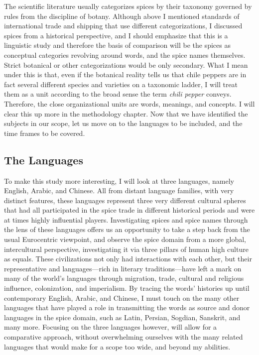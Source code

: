 The scientific literature usually categorizes spices by their taxonomy governed by rules from the discipline of botany. Although above I mentioned standards of international trade and shipping that use different categorizations, I discussed spices from a historical perspective, and I should emphasize that this is a linguistic study and therefore the basis of comparison will be the spices as conceptual categories revolving around words, and the spice names themselves. Strict botanical or other categorizations would be only secondary. What I mean under this is that, even if the botanical reality tells us that chile peppers are in fact several different species and varieties on a taxonomic ladder, I will treat them as a unit according to the broad sense the term \textit{chili pepper} conveys. Therefore, the close organizational units are words, meanings, and concepts. I will clear this up more in the methodology chapter. Now that we have identified the subjects in our scope, let us move on to the languages to be included, and the time frames to be covered.


\subsection{The Languages}

To make this study more interesting, I will look at three languages, namely English, Arabic, and Chinese. All from distant language families, with very distinct features, these languages represent three very different cultural spheres that had all participated in the spice trade in different historical periods and were at times highly influential players. Investigating spices and spice names through the lens of these languages offers us an opportunity to take a step back from the usual Eurocentric viewpoint, and observe the spice domain from a more global, intercultural perspective, investigating it via three pillars of human high culture as equals. These civilizations not only had interactions with each other, but their representative and languages---rich in literary traditions---have left a mark on many of the world's languages through migration, trade, cultural and religious influence, colonization, and imperialism. By tracing the words' histories up until contemporary English, Arabic, and Chinese, I must touch on the many other languages that have played a role in transmitting the words as source and donor languages in the spice domain, such as Latin, Persian, Sogdian, Sanskrit, and many more. Focusing on the three languages however, will allow for a comparative approach, without overwhelming ourselves with the many related languages that would make for a scope too wide, and beyond my abilities.

